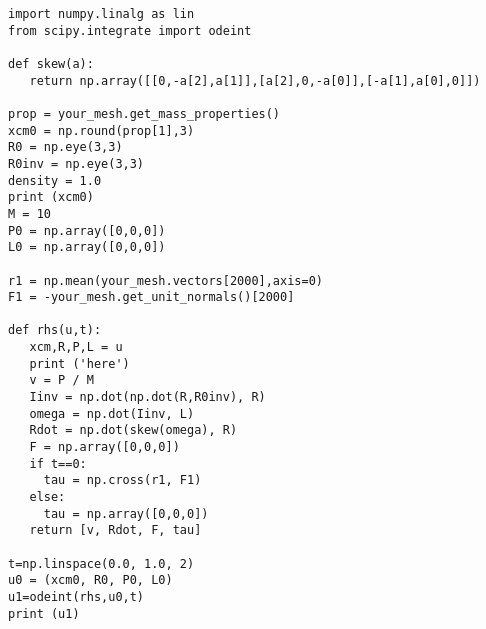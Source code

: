 

\begin{verbatim}
import numpy.linalg as lin
from scipy.integrate import odeint

def skew(a):
   return np.array([[0,-a[2],a[1]],[a[2],0,-a[0]],[-a[1],a[0],0]])

prop = your_mesh.get_mass_properties()
xcm0 = np.round(prop[1],3)
R0 = np.eye(3,3)
R0inv = np.eye(3,3)
density = 1.0
print (xcm0)
M = 10
P0 = np.array([0,0,0])
L0 = np.array([0,0,0])

r1 = np.mean(your_mesh.vectors[2000],axis=0)
F1 = -your_mesh.get_unit_normals()[2000]

def rhs(u,t):
   xcm,R,P,L = u
   print ('here')
   v = P / M
   Iinv = np.dot(np.dot(R,R0inv), R)
   omega = np.dot(Iinv, L)
   Rdot = np.dot(skew(omega), R)   
   F = np.array([0,0,0])
   if t==0:
     tau = np.cross(r1, F1)
   else:
     tau = np.array([0,0,0])
   return [v, Rdot, F, tau]
     
t=np.linspace(0.0, 1.0, 2)
u0 = (xcm0, R0, P0, L0)
u1=odeint(rhs,u0,t)
print (u1)
\end{verbatim}
